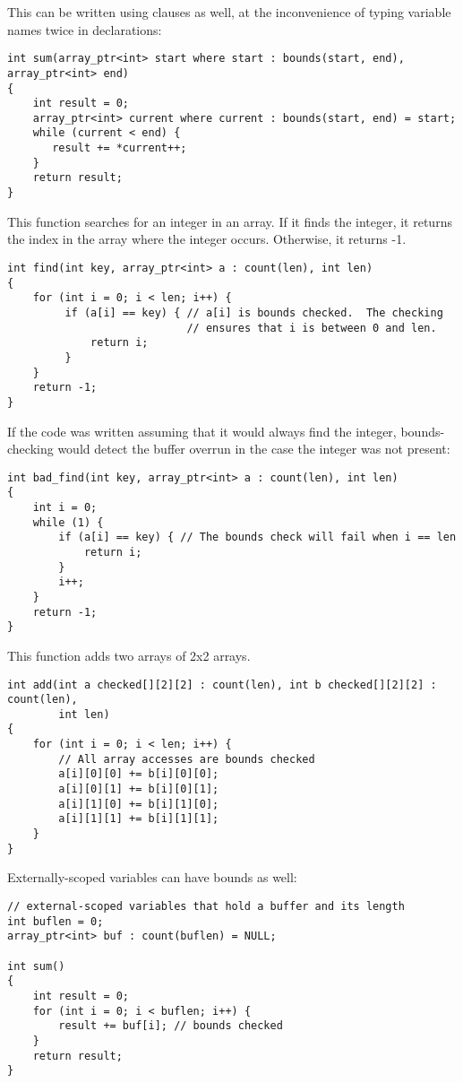 This can be written using  clauses as well, at the
inconvenience of typing variable names twice in declarations:

\begin{verbatim}
int sum(array_ptr<int> start where start : bounds(start, end), array_ptr<int> end)
{ 
    int result = 0;
    array_ptr<int> current where current : bounds(start, end) = start;
    while (current < end) {
       result += *current++;                          
    }
    return result;
}
\end{verbatim}

This function searches for an integer in an array. If it finds the
integer, it returns the index in the array where the integer occurs.
Otherwise, it returns -1.

\begin{verbatim}
int find(int key, array_ptr<int> a : count(len), int len)
{
    for (int i = 0; i < len; i++) {
         if (a[i] == key) { // a[i] is bounds checked.  The checking
                            // ensures that i is between 0 and len.
             return i;
         }
    }
    return -1;
}
\end{verbatim}

If the code was written assuming that it would always find the integer,
bounds-checking would detect the buffer overrun in the case the integer
was not present:

\begin{verbatim}
int bad_find(int key, array_ptr<int> a : count(len), int len)
{
    int i = 0;
    while (1) {
        if (a[i] == key) { // The bounds check will fail when i == len
            return i;
        }
        i++;
    }
    return -1;
}

\end{verbatim}

This function adds two arrays of 2x2 arrays.

\begin{verbatim}
int add(int a checked[][2][2] : count(len), int b checked[][2][2] : count(len), 
        int len) 
{
    for (int i = 0; i < len; i++) {
        // All array accesses are bounds checked
        a[i][0][0] += b[i][0][0]; 
        a[i][0][1] += b[i][0][1];
        a[i][1][0] += b[i][1][0];
        a[i][1][1] += b[i][1][1];
    }
}
\end{verbatim}

Externally-scoped variables can have bounds as well:

\begin{verbatim}
// external-scoped variables that hold a buffer and its length
int buflen = 0;
array_ptr<int> buf : count(buflen) = NULL;

int sum()
{
    int result = 0;
    for (int i = 0; i < buflen; i++) {
        result += buf[i]; // bounds checked
    }
    return result;
}
\end{verbatim}

